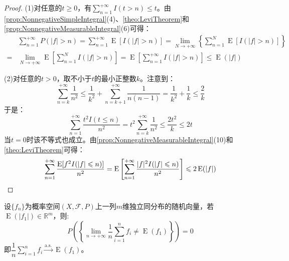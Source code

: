 \begin{proof}
	(1)对任意的$t\geqslant0$，有$\sum\limits_{n=1}^{+\infty}I(t>n)\leqslant t$。由\cref{prop:NonnegativeSimpleIntegral}(4)、\cref{theo:LeviTheorem}和\cref{prop:NonnegativeMeasurableIntegral}(6)可得：
	\begin{align*}
		&\sum_{n=1}^{+\infty}P(|f|>n)=\sum_{n=1}^{+\infty}\operatorname{E}[I(|f|>n)]=\lim_{N\to+\infty}\left\{\sum_{n=1}^{N}\operatorname{E}[I(|f|>n)]\right\} \\
		=&\lim_{N\to+\infty}\operatorname{E}\left[\sum_{n=1}^{N}I(|f|>n)\right]=\operatorname{E}\left[\sum_{n=1}^{+\infty}I(|f|>n)\right]\leqslant\operatorname{E}(|f|)
	\end{align*}\par
	(2)对任意的$t>0$，取不小于$t$的最小正整数$k$。注意到：
	\begin{equation*}
		\sum_{n=k}^{+\infty}\frac{1}{n^2}\leqslant\frac{1}{k^2}+\sum_{n=k+1}^{+\infty}\frac{1}{n(n-1)}=\frac{1}{k^2}+\frac{1}{k}\leqslant\frac{2}{k}
	\end{equation*}
	于是：
	\begin{equation*}
		\sum_{n=1}^{+\infty}\frac{t^2I(t\leqslant n)}{n^2}=t^2\sum_{n=k}^{+\infty}\frac{1}{n^2}\leqslant\frac{2t^2}{k}\leqslant2t
	\end{equation*}
	当$t=0$时该不等式也成立。由\cref{prop:NonnegativeMeasurableIntegral}(10)和\cref{theo:LeviTheorem}可得：
	\begin{equation*}
		\sum_{n=1}^{+\infty}\frac{\operatorname{E}[f^2I(|f|\leqslant n)]}{n^2}=\operatorname{E}\left[\sum_{n=1}^{+\infty}\frac{|f|^2I(|f|\leqslant n)}{n^2}\right]\leqslant2\operatorname{E}(|f|)\qedhere
	\end{equation*}
\end{proof}
\begin{theorem}
	\label{theo:SLLN}
	设$\{f_n\}$为概率空间$(X,\mathscr{F},P)$上一列$m$维独立同分布的随机向量，若$\operatorname{E}(|f_1|)\in\mathbb{R}^{m}$，则:
	\begin{equation*}
		P\left(\left\{\lim_{n\to+\infty}\frac{1}{n}\sum_{i=1}^{n}f_i\ne\operatorname{E}(f_1)\right\}\right)=0
	\end{equation*}
	即$\dfrac{1}{n}\sum\limits_{i=1}^{n}f_i\overset{\text{a.s.}}{\longrightarrow}\operatorname{E}(f_1)$。
\end{theorem}
